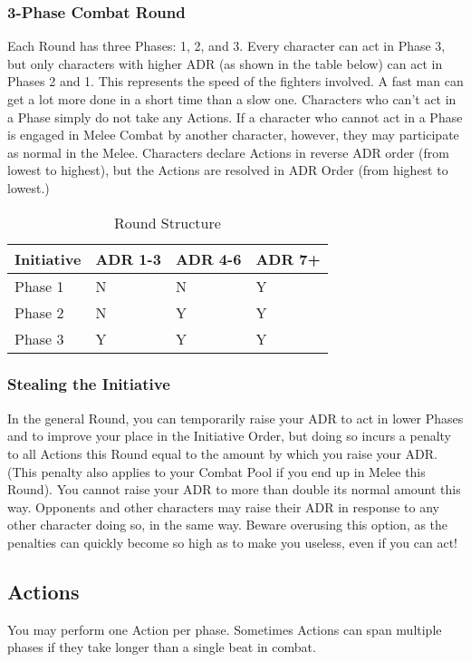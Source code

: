 \documentclass[oneside,11pt,english]{book}
\begin{document}
\subsubsection{3-Phase Combat Round}
Each Round has three Phases: 1, 2, and 3. Every character can act in Phase 3,
but only characters with higher ADR (as shown in the table below) can act in
Phases 2 and 1. This represents the speed of the fighters involved. A fast man
can get a lot more done in a short time than a slow one. Characters who can’t
act in a Phase simply do not take any Actions. If a character who cannot act in
a Phase is engaged in Melee Combat by another character, however, they may
participate as normal in the Melee. Characters declare Actions in reverse ADR
order (from lowest to highest), but the Actions are resolved in ADR Order (from
highest to lowest.)
\begin{table}[!hb]
  \centering
  \caption{Round Structure}
  \label{tab:Round Structure}
  \begin{tabu} spread 0pt {X[2,l] *{3}{X}}
    Initiative&ADR 1-3&ADR 4-6&ADR 7+\\\toprule
    Phase 1&  	N  &	N & 	Y\\
    Phase 2&  	N  &	Y & 	Y\\
    Phase 3&  	Y  &	Y & 	Y\\
  \end{tabu}
\end{table}
\subsubsection{Stealing the Initiative}
In the general Round, you can temporarily raise your ADR to act in lower Phases
and to improve your place in the Initiative Order, but doing so incurs a penalty
to all Actions this Round equal to the amount by which you raise your ADR. (This
penalty also applies to your Combat Pool if you end up in Melee this Round). You
cannot raise your ADR to more than double its normal amount this way. Opponents
and other characters may raise their ADR in response to any other character
doing so, in the same way. Beware overusing this option, as the penalties can
quickly become so high as to make you useless, even if you can act!

\subsection{Actions}\label{sec:combat-actions}
You may perform one Action per phase. Sometimes Actions can span multiple phases
if they take longer than a single beat in combat.
\end{document}
